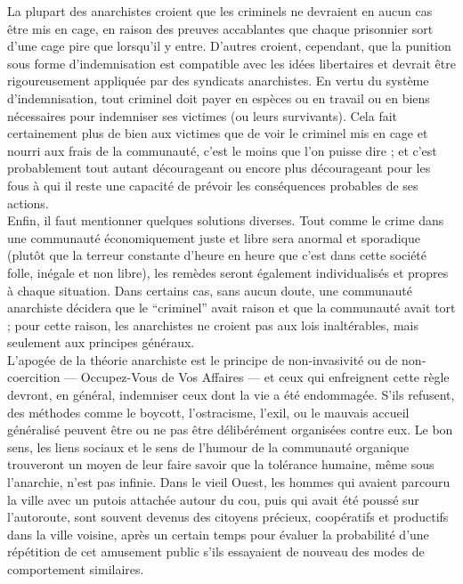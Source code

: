 La plupart des anarchistes croient que les criminels ne devraient en aucun cas être mis en cage, en raison des preuves accablantes que chaque prisonnier sort d'une cage pire que lorsqu'il y entre. D'autres croient, cependant, que la punition sous forme d'indemnisation est compatible avec les idées libertaires et devrait être rigoureusement appliquée par des syndicats anarchistes. En vertu du système d'indemnisation, tout criminel doit payer en espèces ou en travail ou en biens nécessaires pour indemniser ses victimes (ou leurs survivants). Cela fait certainement plus de bien aux victimes que de voir le criminel mis en cage et nourri aux frais de la communauté, c'est le moins que l'on puisse dire ; et c'est probablement tout autant décourageant ou encore plus décourageant pour les fous à qui il reste une capacité de prévoir les conséquences probables de ses actions.\\
Enfin, il faut mentionner quelques solutions diverses. Tout comme le crime dans une communauté économiquement juste et libre sera anormal et sporadique (plutôt que la terreur constante d'heure en heure que c'est dans cette société folle, inégale et non libre), les remèdes seront également individualisés et propres à chaque situation. Dans certains cas, sans aucun doute, une communauté anarchiste décidera que le ``criminel'' avait raison et que la communauté avait tort ; pour cette raison, les anarchistes ne croient pas aux lois inaltérables, mais seulement aux principes généraux.\\
L'apogée de la théorie anarchiste est le principe de non-invasivité ou de non-coercition --- Occupez-Vous de Vos Affaires --- et ceux qui enfreignent cette règle devront, en général, indemniser ceux dont la vie a été endommagée. S'ils refusent, des méthodes comme le boycott, l'ostracisme, l'exil, ou le mauvais accueil généralisé peuvent être ou ne pas être délibérément organisées contre eux. Le bon sens, les liens sociaux et le sens de l'humour de la communauté organique trouveront un moyen de leur faire savoir que la tolérance humaine, même sous l'anarchie, n'est pas infinie. Dans le vieil Ouest, les hommes qui avaient parcouru la ville avec un putois attachée autour du cou, puis qui avait été poussé sur l'autoroute, sont souvent devenus des citoyens précieux, coopératifs et productifs dans la ville voisine, après un certain temps pour évaluer la probabilité d'une répétition de cet amusement public s'ils essayaient de nouveau des modes de comportement similaires.
